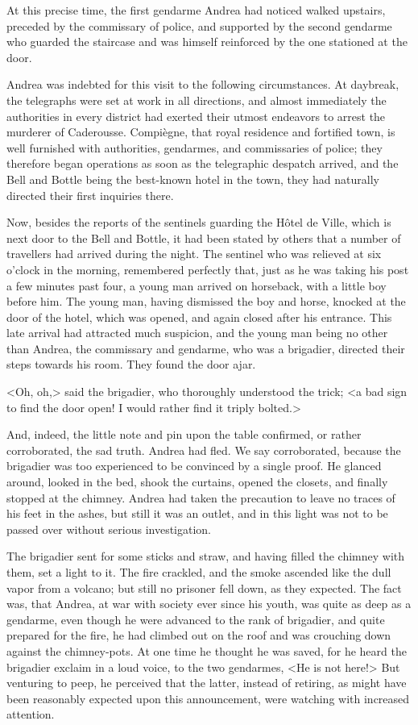  At this precise time, the first gendarme Andrea had noticed walked upstairs, preceded by the commissary of police, and supported by the second gendarme who guarded the staircase and was himself reinforced by the one stationed at the door. 

 Andrea was indebted for this visit to the following circumstances. At daybreak, the telegraphs were set at work in all directions, and almost immediately the authorities in every district had exerted their utmost endeavors to arrest the murderer of Caderousse. Compiègne, that royal residence and fortified town, is well furnished with authorities, gendarmes, and commissaries of police; they therefore began operations as soon as the telegraphic despatch arrived, and the Bell and Bottle being the best-known hotel in the town, they had naturally directed their first inquiries there. 

 Now, besides the reports of the sentinels guarding the Hôtel de Ville, which is next door to the Bell and Bottle, it had been stated by others that a number of travellers had arrived during the night. The sentinel who was relieved at six o'clock in the morning, remembered perfectly that, just as he was taking his post a few minutes past four, a young man arrived on horseback, with a little boy before him. The young man, having dismissed the boy and horse, knocked at the door of the hotel, which was opened, and again closed after his entrance. This late arrival had attracted much suspicion, and the young man being no other than Andrea, the commissary and gendarme, who was a brigadier, directed their steps towards his room. They found the door ajar. 

 <Oh, oh,> said the brigadier, who thoroughly understood the trick; <a bad sign to find the door open! I would rather find it triply bolted.> 

 And, indeed, the little note and pin upon the table confirmed, or rather corroborated, the sad truth. Andrea had fled. We say corroborated, because the brigadier was too experienced to be convinced by a single proof. He glanced around, looked in the bed, shook the curtains, opened the closets, and finally stopped at the chimney. Andrea had taken the precaution to leave no traces of his feet in the ashes, but still it was an outlet, and in this light was not to be passed over without serious investigation. 

 The brigadier sent for some sticks and straw, and having filled the chimney with them, set a light to it. The fire crackled, and the smoke ascended like the dull vapor from a volcano; but still no prisoner fell down, as they expected. The fact was, that Andrea, at war with society ever since his youth, was quite as deep as a gendarme, even though he were advanced to the rank of brigadier, and quite prepared for the fire, he had climbed out on the roof and was crouching down against the chimney-pots.  At one time he thought he was saved, for he heard the brigadier exclaim in a loud voice, to the two gendarmes, <He is not here!> But venturing to peep, he perceived that the latter, instead of retiring, as might have been reasonably expected upon this announcement, were watching with increased attention. 

